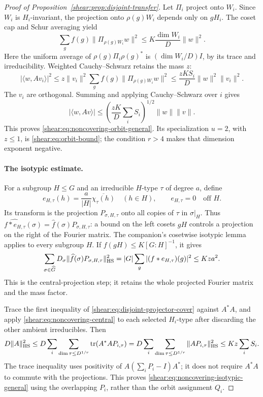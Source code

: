 \begin{proof}[Proof of Proposition~\ref{shear:prop:disjoint-transfer}]
Let \(\Pi_i\) project onto \(W_i\). Since \(W_i\) is \(H_i\)-invariant,
the projection onto \(\rho(g)W_i\) depends only on \(gH_i\).
The coset cap and Schur averaging yield
\[
 \sum_g f(g)\|\Pi_{\rho(g)W_i}w\|^2
 \le K\frac{\dim W_i}{D}\|w\|^2.
\]
Here the uniform average of
\(\rho(g)\Pi_i\rho(g)^*\) is \((\dim W_i/D)I\), by its trace and
irreducibility. Weighted Cauchy--Schwarz retains the mass \(z\):
\[
 |\langle w,Av_i\rangle|^2
 \le z\|v_i\|^2\sum_g f(g)\|\Pi_{\rho(g)W_i}w\|^2
 \le\frac{zKS_i}{D}\|w\|^2\|v_i\|^2.
\]
The \(v_i\) are orthogonal. Summing and applying Cauchy--Schwarz over
\(i\) gives
\[
 |\langle w,Av\rangle|
 \le\left(\frac{zK}{D}\sum_iS_i\right)^{1/2}\|w\|\|v\|.
\]
This proves \eqref{shear:eq:noncovering-orbit-general}.
Its specialization \(u=2\), with \(z\le1\), is
\eqref{shear:eq:orbit-bound}; the condition \(r>4\) makes that
dimension exponent negative.

\paragraph{The isotypic estimate.}
For a subgroup \(H\le G\) and an irreducible \(H\)-type \(\tau\) of
degree \(a\), define
\[
 e_{H,\tau}(h)=\frac{a}{|H|}\overline{\chi_\tau(h)}
 \quad(h\in H),\qquad e_{H,\tau}=0\quad\text{off }H.
\]
Its transform is the projection \(P_{\sigma,H,\tau}\) onto all copies
of \(\tau\) in \(\sigma|_H\). Thus
\(\widehat{f*e_{H,\tau}}(\sigma)=
\widehat f(\sigma)P_{\sigma,H,\tau}\): a bound on the left cosets
\(gH\) controls a projection on the right of the Fourier matrix.
The companion's cosetwise isotypic lemma
\cite[Lemma~]{partial-fourier} applies to
every subgroup \(H\). If \(f(gH)\le K[G:H]^{-1}\), it gives
\begin{equation}
 \sum_{\sigma\in\widehat G}D_\sigma
       \|\widehat f(\sigma)P_{\sigma,H,\tau}\|_{\mathrm{HS}}^2
 =|G|\sum_g|(f*e_{H,\tau})(g)|^2\le Kza^2.
 \label{shear:eq:noncovering-central}
\end{equation}
This is the central-projection step; it retains the whole projected
Fourier matrix and the mass factor.

Trace the first inequality of \eqref{shear:eq:disjoint-projector-cover}
against \(A^*A\), and apply \eqref{shear:eq:noncovering-central} to
each selected \(H_i\)-type after discarding the other ambient
irreducibles. Then
\[
 D\|A\|_{\mathrm{HS}}^2
 \le D\sum_i\sum_{\dim\tau\le D^{1/r}}
       \operatorname{tr}(A^*AP_{i,\tau})
 =D\sum_i\sum_{\dim\tau\le D^{1/r}}
       \|AP_{i,\tau}\|_{\mathrm{HS}}^2
 \le Kz\sum_iS_i.
\]
The trace inequality uses positivity of
\(A(\sum_iP_i-I)A^*\); it does not require \(A^*A\) to commute with
the projections. This proves
\eqref{shear:eq:noncovering-isotypic-general} using the overlapping
\(P_i\), rather than the orbit assignment \(Q_i\).


\end{proof}
